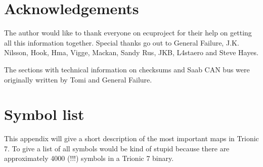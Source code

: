 \documentclass[11pt,a4paper]{book}
\begin{document}
\chapter{Acknowledgements}
The author would like to thank everyone on ecuproject for their help on getting
all this information together. Special thanks go out to General Failure, J.K.
Nilsson, Hook, Hma, Vigge, Mackan, Sandy Rus, JKB, L4staero and Steve Hayes.

The sections with technical information on checksums and Saab CAN bus were originally
written by Tomi and General Failure.



\appendix
\chapter{Symbol list}
This appendix will give a short description of the most important maps in Trionic 7. To give a list of all
symbols would be kind of stupid because there are approximately 4000 (!!!) symbols in a Trionic 7
binary.
\end{document}
